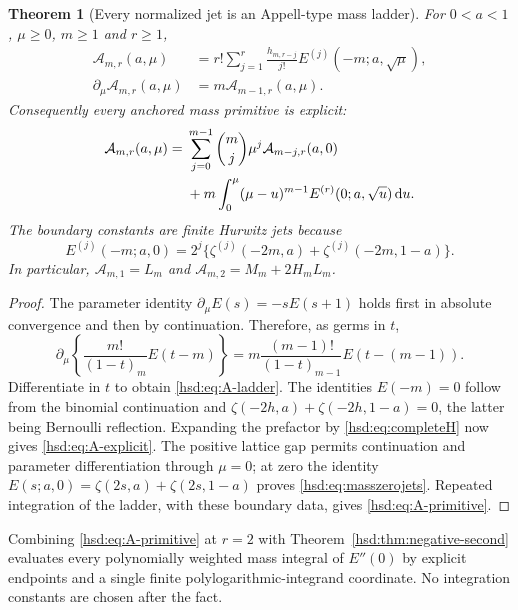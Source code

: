 \documentclass[11pt]{article}
\numberwithin{equation}{section}
\newtheorem{theorem}{Theorem}[section]
\theoremstyle{definition}\newtheorem{definition}[theorem]{Definition}
\theoremstyle{remark}\newtheorem{remark}[theorem]{Remark}
\newcommand{\dd}{\,\mathrm d}
\begin{document}
\begin{theorem}[Every normalized jet is an Appell-type mass ladder]
\label{hsd:thm:Appell}
For $0<a<1$, $\mu\ge0$, $m\ge1$ and $r\ge1$,
\begin{align}
 \mathcal A_{m,r}(a,\mu)&=r!\sum_{j=1}^r
                 \frac{h_{m,r-j}}{j!}E^{(j)}(-m;a,\sqrt\mu),
                 \label{hsd:eq:A-explicit}\\
 \partial_\mu\mathcal A_{m,r}(a,\mu)&=m\mathcal A_{m-1,r}(a,\mu).
                 \label{hsd:eq:A-ladder}
\end{align}
Consequently every anchored mass primitive is explicit:
\begin{align}
 \mathcal A_{m,r}(a,\mu)={}&\sum_{j=0}^{m-1}\binom mj\mu^j
                                  \mathcal A_{m-j,r}(a,0)\notag\\
 &+m\int_0^\mu(\mu-u)^{m-1}E^{(r)}(0;a,\sqrt u)\dd u.
 \label{hsd:eq:A-primitive}
\end{align}
The boundary constants are finite Hurwitz jets because
\begin{equation}\label{hsd:eq:masszerojets}
 E^{(j)}(-m;a,0)=2^j\{\zeta^{(j)}(-2m,a)+\zeta^{(j)}(-2m,1-a)\}.
\end{equation}
In particular,
$\mathcal A_{m,1}=L_m$ and
$\mathcal A_{m,2}=M_m+2H_mL_m$.
\end{theorem}
\begin{proof}
The parameter identity $\partial_\mu E(s)=-sE(s+1)$ holds first in
absolute convergence and then by continuation. Therefore, as germs in $t$,
\[
 \partial_\mu\left\{\frac{m!}{(1-t)_m}E(t-m)\right\}
 =m\frac{(m-1)!}{(1-t)_{m-1}}E(t-(m-1)).
\]
Differentiate in $t$ to obtain \eqref{hsd:eq:A-ladder}.
The identities $E(-m)=0$ follow from the binomial continuation and
$\zeta(-2h,a)+\zeta(-2h,1-a)=0$, the latter being Bernoulli reflection.
Expanding the prefactor by \eqref{hsd:eq:completeH} now gives
\eqref{hsd:eq:A-explicit}. The positive lattice gap permits continuation
and parameter differentiation through $\mu=0$; at zero the identity
$E(s;a,0)=\zeta(2s,a)+\zeta(2s,1-a)$ proves
\eqref{hsd:eq:masszerojets}. Repeated integration of the ladder, with
these boundary data, gives \eqref{hsd:eq:A-primitive}.
\end{proof}

Combining \eqref{hsd:eq:A-primitive} at $r=2$ with
Theorem~\ref{hsd:thm:negative-second} evaluates every polynomially weighted
mass integral of $E''(0)$ by explicit endpoints and a single finite
polylogarithmic-integrand coordinate. No integration constants are
chosen after the fact.
\end{document}
